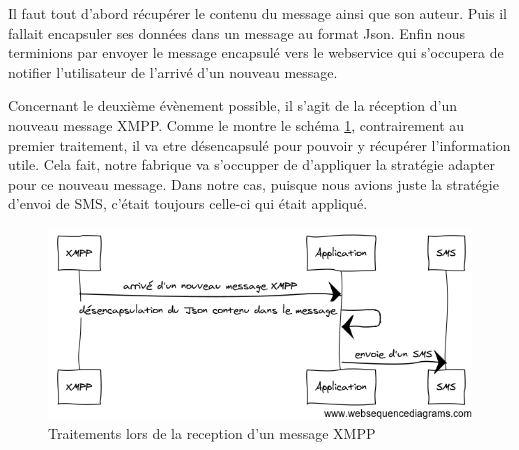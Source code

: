 Il faut tout d'abord récupérer le contenu du message ainsi que son auteur. Puis il fallait encapsuler 
ses données dans un message au format Json. Enfin nous terminions par envoyer le message encapsulé vers 
le webservice qui s'occupera de notifier l'utilisateur de l'arrivé d'un nouveau message.

Concernant le deuxième évènement possible, il s'agit de la réception d'un nouveau message XMPP. Comme le
montre le schéma \ref{desencapsulation}, contrairement au premier traitement, il va etre désencapsulé pour 
pouvoir y récupérer l'information utile. Cela fait, notre fabrique va s'occupper de d'appliquer la stratégie 
adapter pour ce nouveau message. Dans notre cas, puisque nous avions juste la stratégie d'envoi de SMS, c'était 
toujours celle-ci qui était appliqué.


\begin{figure}[!h]
	\center
	\includegraphics[width=12cm]{img/desencapsulation.png}
	\caption{Traitements lors de la reception d'un message XMPP}
	\label{desencapsulation}
\end{figure}
